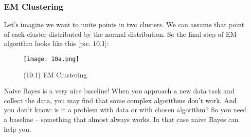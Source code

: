 \subsubsection*{EM Clustering}

Let's imagine we want to unite points in two clusters. We can assume that point of each cluster distributed by the normal distribution. So the final step of EM algorithm looks like this [pic. 10.1]:\\
\begin{wrapfigure}{r}{0.33\linewidth}
	\vspace{-0.5cm}
  \begin{center}
    \texttt{[image: 10a.png]}
    \caption*{(10.1) EM Clustering}
  \end{center}
\end{wrapfigure}
Naive Bayes is a very nice baseline! When you approach a new data task and collect the data, you may find that some complex algorithms don't work. And you don't know: is it a problem with data or with chosen algorithm? So you need a baseline -- something that almost always works. In that case naive Bayes can help you.